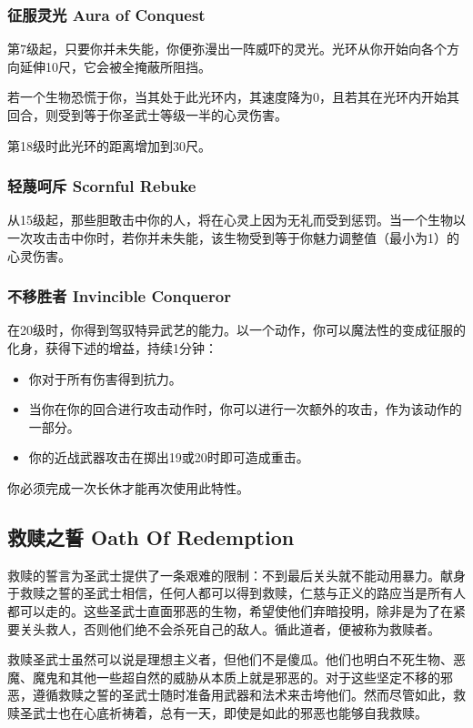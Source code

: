 \subsubsection{征服灵光 Aura of Conquest}第7级起，只要你并未失能，你便弥漫出一阵威吓的灵光。光环从你开始向各个方向延伸10尺，它会被全掩蔽所阻挡。

若一个生物恐慌于你，当其处于此光环内，其速度降为0，且若其在光环内开始其回合，则受到等于你圣武士等级一半的心灵伤害。

第18级时此光环的距离增加到30尺。

\subsubsection{轻蔑呵斥 Scornful Rebuke}从15级起，那些胆敢击中你的人，将在心灵上因为无礼而受到惩罚。当一个生物以一次攻击击中你时，若你并未失能，该生物受到等于你魅力调整值（最小为1）的心灵伤害。

\subsubsection{不移胜者 Invincible Conqueror}在20级时，你得到驾驭特异武艺的能力。以一个动作，你可以魔法性的变成征服的化身，获得下述的增益，持续1分钟：
\begin{itemize}
\item 你对于所有伤害得到抗力。
\item 当你在你的回合进行攻击动作时，你可以进行一次额外的攻击，作为该动作的一部分。
\item 你的近战武器攻击在掷出19或20时即可造成重击。
\end{itemize}

你必须完成一次长休才能再次使用此特性。


\subsection{救赎之誓 Oath Of Redemption}救赎的誓言为圣武士提供了一条艰难的限制：不到最后关头就不能动用暴力。献身于救赎之誓的圣武士相信，任何人都可以得到救赎，仁慈与正义的路应当是所有人都可以走的。这些圣武士直面邪恶的生物，希望使他们弃暗投明，除非是为了在紧要关头救人，否则他们绝不会杀死自己的敌人。循此道者，便被称为救赎者。

救赎圣武士虽然可以说是理想主义者，但他们不是傻瓜。他们也明白不死生物、恶魔、魔鬼和其他一些超自然的威胁从本质上就是邪恶的。对于这些坚定不移的邪恶，遵循救赎之誓的圣武士随时准备用武器和法术来击垮他们。然而尽管如此，救赎圣武士也在心底祈祷着，总有一天，即使是如此的邪恶也能够自我救赎。

